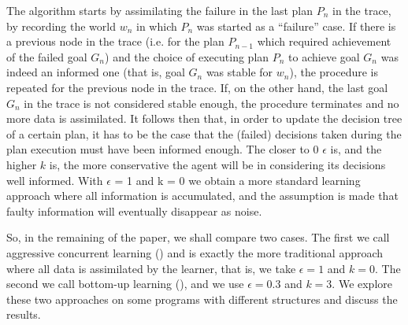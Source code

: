 The algorithm starts by assimilating the failure in the last plan
$P_n$ in the trace, by recording the world $w_n$ in which $P_n$ was
started as a ``failure'' case.
If there is a previous node in the trace (i.e. for the plan $P_{n-1}$
which required achievement of the failed goal $G_n$) and the choice of
executing plan $P_n$ to achieve goal $G_n$ was indeed an informed one
(that is, goal $G_n$ was stable for $w_n$), the procedure is repeated
for the previous node in the trace.  If, on the other hand, the last
goal $G_n$ in the trace is not considered stable enough, the procedure
terminates and no more data is assimilated.
%
It follows then that, in order to update the decision tree of a certain
plan, it has to be the case that the (failed) decisions taken during
the plan execution must have been informed enough.
The closer to 0 $\epsilon$ is, and the higher $k$ is, the more
conservative the agent will be in considering its decisions well
informed. With $\epsilon$ = 1 and k = 0 we obtain a more standard
learning approach where all information is accumulated, and the
assumption is made that faulty information will eventually disappear
as noise.

So, in the remaining of the paper, we shall compare two cases. The first we call
aggressive concurrent learning (\CL) and is exactly the more traditional approach where all data is
assimilated by the learner, that is, we take $\epsilon = 1$ and $k = 0$.
The second we call bottom-up learning (\BUL), and we use $\epsilon = 0.3$ and
$k = 3$.
We explore these two approaches on some programs with different
structures  and discuss the results.
